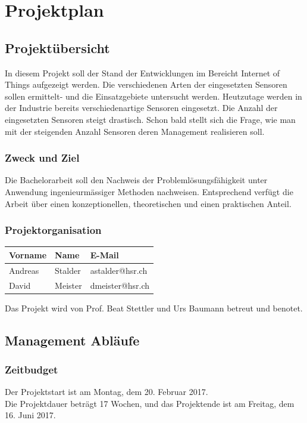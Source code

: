 \chapter{Projektplan}
\section{Projektübersicht}
In diesem Projekt soll der Stand der Entwicklungen im Bereicht \glqq Internet of Things\grqq{} aufgezeigt werden. Die verschiedenen Arten der eingesetzten Sensoren sollen ermittelt- und die Einsatzgebiete untersucht werden. Heutzutage werden in der Industrie bereits verschiedenartige Sensoren eingesetzt. Die Anzahl der eingesetzten Sensoren steigt drastisch. Schon bald stellt sich die Frage, wie man mit der steigenden Anzahl Sensoren deren Management realisieren soll.
\subsection{Zweck und Ziel}
Die Bachelorarbeit soll den Nachweis der Problemlösungsfähigkeit unter Anwendung
ingenieurmässiger Methoden nachweisen. Entsprechend verfügt die Arbeit über einen
konzeptionellen, theoretischen und einen praktischen Anteil.
\subsection{Projektorganisation}
\begin{table}[H]
\centering
    \begin{tabular}{@{} l l l@{}}    
    {Vorname} & {Name} & {E-Mail} \\ \midrule
    Andreas & Stalder & astalder@hsr.ch \\ \addlinespace
    David & Meister & dmeister@hsr.ch \\ \bottomrule
    \end{tabular}
\end{table} 

Das Projekt wird von Prof. Beat Stettler und Urs Baumann betreut und benotet.
\section{Management Abläufe}
\subsection{Zeitbudget}
Der Projektstart ist am Montag, dem 20. Februar 2017. \\
Die Projektdauer beträgt 17 Wochen, und das Projektende ist am Freitag, dem 16. Juni 2017. \\


